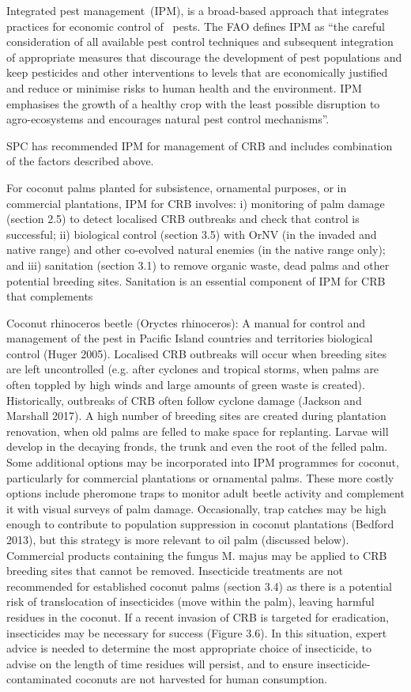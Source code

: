 \documentclass[twocolumn,letterpaper]{scrartcl}
\begin{document}
Integrated pest management (IPM), is a broad-based approach that integrates practices for economic control 
of  pests.  The  FAO  defines  IPM  as  “the  careful  consideration  of  all  available  pest  control  techniques  and 
subsequent integration of appropriate measures that discourage the development of pest populations and 
keep pesticides and other interventions to levels that are economically justified and reduce or minimise risks 
to human health and the environment. IPM emphasises the growth of a healthy crop with the least possible 
disruption to agro-ecosystems and encourages natural pest control mechanisms”.

SPC has recommended IPM for management of CRB and includes combination of the factors described above. 

For coconut palms planted for subsistence, ornamental purposes, or in commercial plantations, IPM for CRB 
involves: i) monitoring of palm damage (section 2.5) to detect localised CRB outbreaks and check that control is 
successful; ii) biological control (section 3.5) with OrNV (in the invaded and native range) and other co-evolved 
natural enemies (in the native range only); and iii) sanitation (section 3.1) to remove organic waste, dead palms 
and  other  potential  breeding  sites.  Sanitation  is  an  essential  component  of  IPM  for  CRB  that  complements 

Coconut rhinoceros beetle (Oryctes rhinoceros): A manual for control and management of the pest in Pacific Island countries and territoriesbiological control (Huger 2005). Localised CRB outbreaks will occur when breeding sites are left uncontrolled 
(e.g. after cyclones and tropical storms, when palms are often toppled by high winds and large amounts of 
green waste is created). Historically, outbreaks of CRB often follow cyclone damage (Jackson and Marshall 2017). 
A high number of breeding sites are created during plantation renovation, when old palms are felled to make 
space for replanting. Larvae will develop in the decaying fronds, the trunk and even the root of the felled palm. 
Some additional options may be incorporated into IPM programmes for coconut, particularly for commercial 
plantations or ornamental palms. These more costly options include pheromone traps to monitor adult beetle 
activity and complement it with visual surveys of palm damage. Occasionally, trap catches may be high enough 
to  contribute  to  population  suppression  in  coconut  plantations  (Bedford  2013),  but  this  strategy  is  more 
relevant to oil palm (discussed below). Commercial products containing the fungus M. majus may be applied 
to CRB breeding sites that cannot be removed. Insecticide treatments are not recommended for established 
coconut palms (section 3.4) as there is a potential risk of translocation of insecticides (move within the palm), 
leaving harmful residues in the coconut. If a recent invasion of CRB is targeted for eradication, insecticides 
may  be  necessary  for  success  (Figure  3.6).  In  this  situation,  expert  advice  is  needed  to  determine  the  most 
appropriate choice of insecticide, to advise on the length of time residues will persist, and to ensure insecticide-
contaminated coconuts are not harvested for human consumption. 
\end{document}

